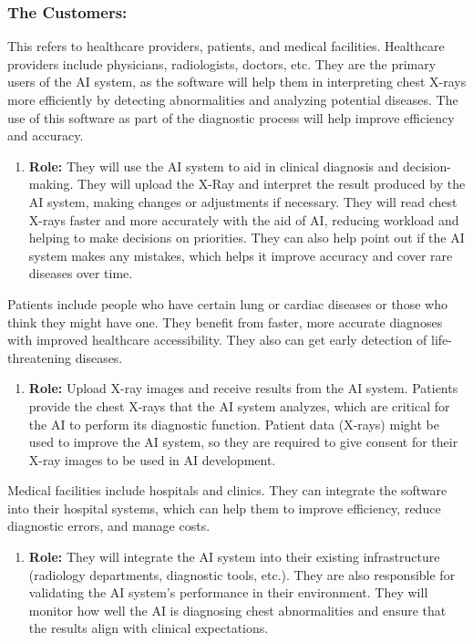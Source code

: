 \documentclass[12pt]{article}
\begin{document}
\subsubsection{The Customers:}
This refers to healthcare providers, patients, and medical facilities.
\newline
Healthcare providers include physicians, radiologists, doctors, etc. They are the primary users of the AI system, as the software will help them in interpreting chest X-rays more efficiently by detecting abnormalities and analyzing potential diseases. The use of this software as part of the diagnostic process will help improve efficiency and accuracy.

\begin{enumerate}
\item \textbf{Role:} They will use the AI system to aid in clinical diagnosis and decision-making. They will upload the X-Ray and interpret the result produced by the AI system, making changes or adjustments if necessary. They will read chest X-rays faster and more accurately with the aid of AI, reducing workload and helping to make decisions on priorities. They can also help point out if the AI system makes any mistakes, which helps it improve accuracy and cover rare diseases over time.
\end{enumerate}
Patients include people who have certain lung or cardiac diseases or those who think they might have one. They benefit from faster, more accurate diagnoses with improved healthcare accessibility. They also can get early detection of life-threatening diseases.

\begin{enumerate}
\item \textbf{Role:} Upload X-ray images and receive results from the AI system. Patients provide the chest X-rays that the AI system analyzes, which are critical for the AI to perform its diagnostic function. Patient data (X-rays) might be used to improve the AI system, so they are required to give consent for their X-ray images to be used in AI development.
\end{enumerate}
Medical facilities include hospitals and clinics. They can integrate the software into their hospital systems, which can help them to improve efficiency, reduce diagnostic errors, and manage costs.

\begin{enumerate}
\item \textbf{Role:} They will integrate the AI system into their existing infrastructure (radiology departments, diagnostic tools, etc.). They are also responsible for validating the AI system's performance in their environment. They will monitor how well the AI is diagnosing chest abnormalities and ensure that the results align with clinical expectations.
\end{enumerate}
\end{document}
